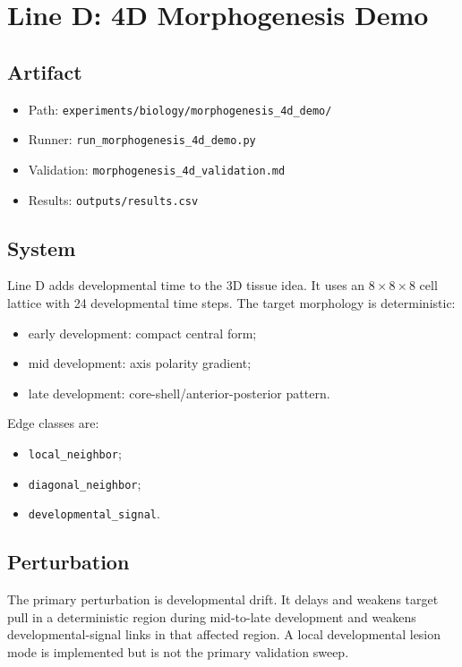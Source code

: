 \documentclass[11pt]{article}
\begin{document}
\section{Line D: 4D Morphogenesis Demo}

\subsection{Artifact}

\begin{itemize}
\item Path: \texttt{experiments/biology/morphogenesis\_4d\_demo/}
\item Runner: \texttt{run\_morphogenesis\_4d\_demo.py}
\item Validation: \texttt{morphogenesis\_4d\_validation.md}
\item Results: \texttt{outputs/results.csv}
\end{itemize}

\subsection{System}

Line D adds developmental time to the 3D tissue idea. It uses an \(8\times 8\times 8\) cell lattice with 24 developmental time steps. The target morphology is deterministic:

\begin{itemize}
\item early development: compact central form;
\item mid development: axis polarity gradient;
\item late development: core-shell/anterior-posterior pattern.
\end{itemize}

Edge classes are:

\begin{itemize}
\item \texttt{local\_neighbor};
\item \texttt{diagonal\_neighbor};
\item \texttt{developmental\_signal}.
\end{itemize}

\subsection{Perturbation}

The primary perturbation is developmental drift. It delays and weakens target pull in a deterministic region during mid-to-late development and weakens developmental-signal links in that affected region. A local developmental lesion mode is implemented but is not the primary validation sweep.
\end{document}
